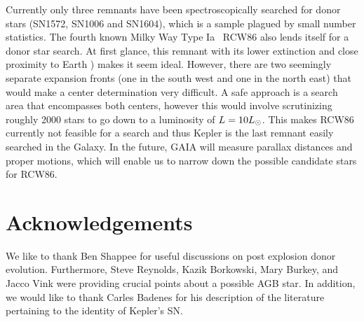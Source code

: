 \documentclass[preprint2]{aastex}
\begin{document}
Currently only three remnants have been spectroscopically searched for donor stars (SN1572, SN1006 and SN1604), which is a sample plagued by small number statistics. The fourth known Milky Way Type Ia \snr~RCW86 also lends itself for a donor star search. At first glance, this remnant with its lower extinction \citep[$A_V \approx 1.7$;][]{1983MNRAS.204..273L} and close proximity to Earth \citep[$d=2.5~\kpc$; ][]{2011ApJ...741...96W}) makes it seem ideal. However, there are two seemingly separate expansion fronts (one in the south west and one in the north east) that would make a center determination very difficult. A safe approach is a search area that encompasses both centers, however this would involve scrutinizing roughly 2000 stars to go down to a luminosity of $L=10\hbox{$L_{\odot}$}$. This makes RCW86 currently not feasible for a search and thus Kepler is the last remnant easily searched in the Galaxy. In the future, GAIA will measure parallax distances and proper motions, which will enable us to narrow down the possible candidate stars for RCW86.



\section{Acknowledgements}

We like to thank Ben Shappee for useful discussions on post explosion donor evolution. Furthermore, Steve Reynolds, Kazik Borkowski, Mary Burkey, and Jacco Vink were providing crucial points about a possible AGB star. In addition, we would like to thank Carles Badenes for his description of the literature pertaining to the identity of Kepler's SN.



\end{document}
